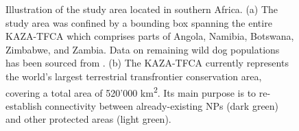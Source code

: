 \documentclass[abstract=on,10pt,a4paper,bibliography=totocnumbered]{article}
\begin{document}
\begin{figure}[h]
  \begin{center}
    \caption{Illustration of the study area located in southern Africa. (a) The
    study area was confined by a bounding box spanning the entire KAZA-TFCA
    which comprises parts of Angola, Namibia, Botswana, Zimbabwe, and Zambia.
    Data on remaining wild dog populations has been sourced from
    \cite{Woodroffe.2012}. (b) The KAZA-TFCA currently represents the world's
    largest terrestrial transfrontier conservation area, covering a total area
    of 520'000 km\textsuperscript{2}. Its main purpose is to re-establish
    connectivity between already-existing NPs (dark green) and other protected
    areas (light green).}
    \label{StudyArea}
  \end{center}
\end{figure}
\end{document}
